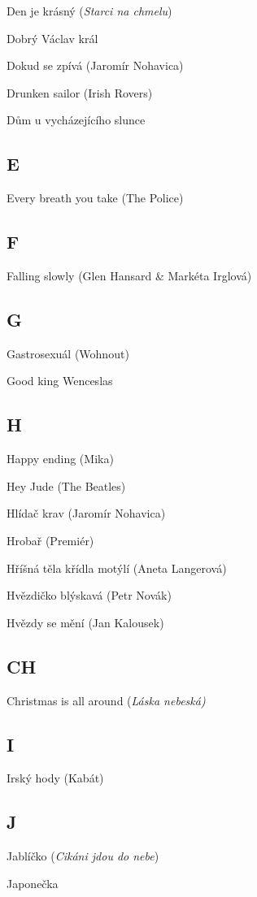 \begin{multicols}{2}
Den je krásný (\emph{Starci na chmelu})

Dobrý Václav král

Dokud se zpívá (Jaromír Nohavica)

Drunken sailor (Irish Rovers)

Dům u vycházejícího slunce

\subsection*{E}
Every breath you take (The Police)

\subsection*{F}
Falling slowly (Glen Hansard \& Markéta Irglová)

\subsection*{G}
Gastrosexuál (Wohnout)

Good king Wenceslas

\subsection*{H}
Happy ending (Mika)

Hey Jude (The Beatles)

Hlídač krav (Jaromír Nohavica)

Hrobař (Premiér)

Hříšná těla křídla motýlí (Aneta Langerová)

Hvězdičko blýskavá (Petr Novák)

Hvězdy se mění (Jan Kalousek)

\subsection*{CH}
Christmas is all around (\emph{Láska nebeská)}

\subsection*{I}
Irský hody (Kabát)

\subsection*{J}
Jablíčko (\emph{Cikáni jdou do nebe})

Japonečka


\end{multicols}
